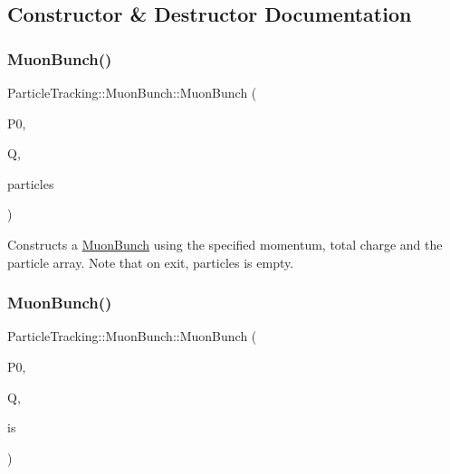 \subsection{Constructor \& Destructor Documentation}
\mbox{\label{classParticleTracking_1_1MuonBunch_a077d02b03d0ad009d12562e4c06fe444}} 
\subsubsection{\texorpdfstring{Muon\+Bunch()}{MuonBunch()}\hspace{0.1cm}{\footnotesize\ttfamily [1/3]}}
{\footnotesize\ttfamily Particle\+Tracking\+::\+Muon\+Bunch\+::\+Muon\+Bunch (\begin{DoxyParamCaption}\item[{double}]{P0,  }\item[{double}]{Q,  }\item[{P\+Svector\+Array \&}]{particles }\end{DoxyParamCaption})\hspace{0.3cm}{\ttfamily [inline]}}

Constructs a \hyperlink{classParticleTracking_1_1MuonBunch}{Muon\+Bunch} using the specified momentum, total charge and the particle array. Note that on exit, particles is empty. \mbox{\label{classParticleTracking_1_1MuonBunch_a1c9caceed02a15a0fde3cea4ead6688a}} 
\subsubsection{\texorpdfstring{Muon\+Bunch()}{MuonBunch()}\hspace{0.1cm}{\footnotesize\ttfamily [2/3]}}
{\footnotesize\ttfamily Particle\+Tracking\+::\+Muon\+Bunch\+::\+Muon\+Bunch (\begin{DoxyParamCaption}\item[{double}]{P0,  }\item[{double}]{Q,  }\item[{std\+::istream \&}]{is }\end{DoxyParamCaption})\hspace{0.3cm}{\ttfamily [inline]}}

